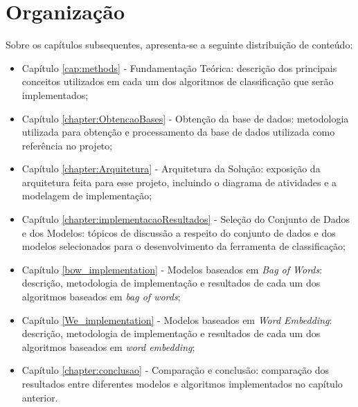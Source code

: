 \section{Organização}
Sobre os capítulos subsequentes, apresenta-se a seguinte distribuição de conteúdo:
\begin{itemize}
\item Capítulo \ref{cap:methods} - Fundamentação Teórica:
descrição dos principais conceitos utilizados em cada um dos algoritmos de classificação que serão implementados;
\item Capítulo \ref{chapter:ObtencaoBases} - Obtenção da base de dados:
metodologia utilizada para obtenção e processamento da base de dados utilizada como referência no projeto;
\item Capítulo \ref{chapter:Arquitetura} - Arquitetura da Solução:
exposição da arquitetura feita para esse projeto, incluindo o diagrama de atividades e a modelagem de implementação;
\item Capítulo \ref{chapter:implementacaoResultados} - Seleção do Conjunto de Dados e dos Modelos:
tópicos de discussão a respeito do conjunto de dados e dos modelos selecionados para o desenvolvimento da ferramenta de classificação;
\item Capítulo \ref{bow_implementation} - Modelos baseados em \textit{Bag of Words}:
descrição, metodologia de implementação e resultados de cada um dos algoritmos baseados em \textit{bag of words};
\item Capítulo \ref{We_implementation} - Modelos baseados em \textit{Word Embedding}:
descrição, metodologia de implementação e resultados de cada um dos algoritmos baseados em \textit{word embedding};
\item Capítulo \ref{chapter:conclusao} - Comparação e conclusão:
comparação dos resultados entre diferentes modelos e algoritmos implementados no capítulo anterior.
\end{itemize}